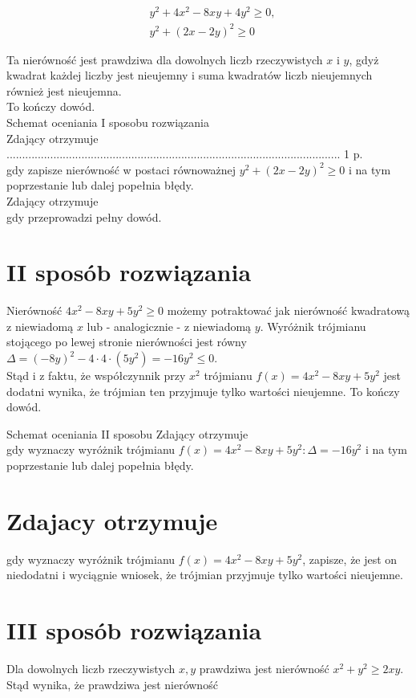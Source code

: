 \documentclass[10pt]{article}
\begin{document}
$$
\begin{aligned}
& y^{2}+4 x^{2}-8 x y+4 y^{2} \geq 0, \\
& y^{2}+(2 x-2 y)^{2} \geq 0
\end{aligned}
$$

Ta nierówność jest prawdziwa dla dowolnych liczb rzeczywistych $x$ i $y$, gdyż kwadrat każdej liczby jest nieujemny i suma kwadratów liczb nieujemnych również jest nieujemna.\\
To kończy dowód.\\
Schemat oceniania I sposobu rozwiązania\\
Zdający otrzymuje ........................................................................................................... 1 p.\\
gdy zapisze nierówność w postaci równoważnej $y^{2}+(2 x-2 y)^{2} \geq 0$ i na tym poprzestanie lub dalej popełnia błędy.\\
Zdający otrzymuje\\
gdy przeprowadzi pełny dowód.

\section*{II sposób rozwiązania}
Nierówność $4 x^{2}-8 x y+5 y^{2} \geq 0$ możemy potraktować jak nierówność kwadratową z niewiadomą $x$ lub - analogicznie - z niewiadomą $y$. Wyróżnik trójmianu stojącego po lewej stronie nierówności jest równy\\
$\Delta=(-8 y)^{2}-4 \cdot 4 \cdot\left(5 y^{2}\right)=-16 y^{2} \leq 0$.\\
Stąd i z faktu, że współczynnik przy $x^{2}$ trójmianu $f(x)=4 x^{2}-8 x y+5 y^{2}$ jest dodatni wynika, że trójmian ten przyjmuje tylko wartości nieujemne. To kończy dowód.

Schemat oceniania II sposobu Zdający otrzymuje\\
gdy wyznaczy wyróżnik trójmianu $f(x)=4 x^{2}-8 x y+5 y^{2}: \Delta=-16 y^{2}$ i na tym poprzestanie lub dalej popełnia błędy.

\section*{Zdajacy otrzymuje}
gdy wyznaczy wyróżnik trójmianu $f(x)=4 x^{2}-8 x y+5 y^{2}$, zapisze, że jest on niedodatni i wyciągnie wniosek, że trójmian przyjmuje tylko wartości nieujemne.

\section*{III sposób rozwiązania}
Dla dowolnych liczb rzeczywistych $x, y$ prawdziwa jest nierówność $x^{2}+y^{2} \geq 2 x y$. Stąd wynika, że prawdziwa jest nierówność
\end{document}
